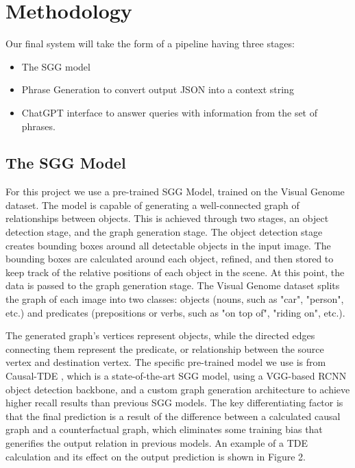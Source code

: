 \documentclass[letterpaper, 10 pt, conference]{ieeeconf}  %
\begin{document}
\section{Methodology}
    Our final system will take the form of a pipeline having three stages:
    \begin{itemize}
        \item The SGG model
        \item Phrase Generation to convert output JSON into a context string
        \item ChatGPT interface to answer queries with information from the set of phrases.
    \end{itemize}

    \subsection*{The SGG Model}
        For this project we use a pre-trained SGG Model, trained on the Visual Genome dataset. The model is capable of generating a well-connected graph of relationships between objects. This is achieved through two stages, an object detection stage, and the graph generation stage. The object detection stage creates bounding boxes around all detectable objects in the input image. The bounding boxes are calculated around each object, refined, and then stored to keep track of the relative positions of each object in the scene. At this point, the data is passed to the graph generation stage.
        The Visual Genome dataset splits the graph of each image into two classes: objects (nouns, such as "car", "person", etc.) and predicates (prepositions or verbs, such as "on top of", "riding on", etc.).
        
        The generated graph's vertices represent objects, while the directed edges connecting them represent the predicate, or relationship between the source vertex and destination vertex. The specific pre-trained model we use is from Causal-TDE \cite{tang2020sggcode}, which is a state-of-the-art SGG model, using a VGG-based RCNN object detection backbone, and a custom graph generation architecture to achieve higher recall results than previous SGG models. The key differentiating factor is that the final prediction is a result of the difference between a calculated causal graph and a counterfactual graph, which eliminates some training bias that generifies the output relation in previous models. An example of a TDE calculation and its effect on the output prediction is shown in Figure 2.
\end{document}
